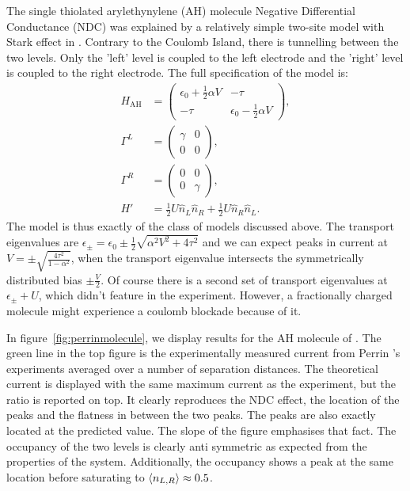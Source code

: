 \documentclass{article}
\begin{document}
\begin{multicols}{2}
        The single thiolated arylethynylene (AH) molecule Negative Differential Conductance (NDC) was explained by a relatively simple two-site model with Stark effect in \citet{perrinnano}. Contrary to the Coulomb Island, there is tunnelling between the two levels. Only the 'left' level is coupled to the left electrode and the 'right' level is coupled to the right electrode. The full specification of the model is:
        \begin{align*}
            H_\text{AH} &= \begin{pmatrix} \epsilon_0 + \frac{1}{2}\alpha V & -\tau \\-\tau &  \epsilon_0 - \frac{1}{2} \alpha V\end{pmatrix}, \\
            \Gamma^L &= \begin{pmatrix} \gamma & 0 \\ 0 & 0 \end{pmatrix} ,\\
            \Gamma^R &= \begin{pmatrix} 0 & 0 \\ 0 & \gamma \end{pmatrix} ,\\
            H' &= \frac{1}{2} U \hat{n}_L \hat{n}_R + \frac{1}{2} U \hat{n}_R \hat{n}_L.
        \end{align*}
        The model is thus exactly of the class of models discussed above. The transport eigenvalues are $\epsilon_\pm = \epsilon_0 \pm \frac{1}{2} \sqrt{\alpha^2 V^2 + 4\tau^2}$ and we can expect peaks in current at $V = \pm \sqrt{ \frac{4\tau^2}{1-\alpha^2}}$, when the transport eigenvalue intersects the symmetrically distributed bias $\pm \frac{V}{2}$. Of course there is a second set of transport eigenvalues at $\epsilon_\pm + U$, which didn't feature in the experiment. However, a fractionally charged molecule might experience a coulomb blockade because of it.
        
        In figure~\ref{fig:perrinmolecule}, we display results for the AH molecule of \citet{perrinnano}. The green line in the top figure is the experimentally measured current from Perrin 's experiments averaged over a number of separation distances. The theoretical current is displayed with the same maximum current as the experiment, but the ratio is reported on top. It clearly reproduces the NDC effect, the location of the peaks and the flatness in between the two peaks. The peaks are also exactly located at the predicted value. The slope of the figure emphasises that fact. The occupancy of the two levels is clearly anti symmetric as expected from the properties of the system. Additionally, the occupancy shows a peak at the same location before saturating to $\braket{n_{L,R}}\approx0.5$.
    

\end{multicols}
\end{document}
